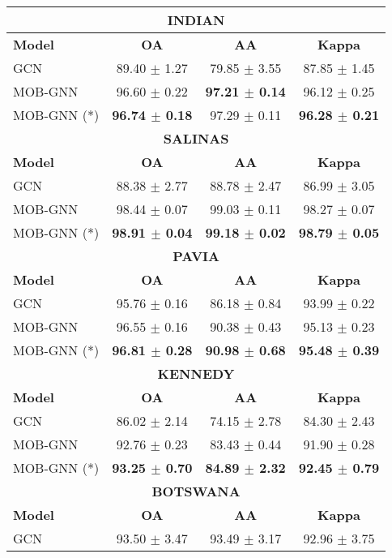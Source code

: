 \begin{table}[h]
\begin{minipage}{0.49\textwidth}
\centering
\small
\begin{tabular}{|lccc|}
\hline
\multicolumn{4}{|c|}{\textbf{INDIAN}} \\
\hline
\textbf{Model} & \textbf{OA} & \textbf{AA} & \textbf{Kappa} \\
\hline
GCN & 89.40 $\pm$ 1.27 & 79.85 $\pm$ 3.55 & 87.85 $\pm$ 1.45 \\
MOB-GNN & 96.60 $\pm$ 0.22 & \textbf{97.21 $\pm$ 0.14} & 96.12 $\pm$ 0.25 \\
MOB-GNN (*) & \textbf{96.74 $\pm$ 0.18} & 97.29 $\pm$ 0.11 & \textbf{96.28 $\pm$ 0.21} \\
\hline
\multicolumn{4}{|c|}{\textbf{SALINAS}} \\
\hline
\textbf{Model} & \textbf{OA} & \textbf{AA} & \textbf{Kappa} \\
\hline
GCN & 88.38 $\pm$ 2.77 & 88.78 $\pm$ 2.47 & 86.99 $\pm$ 3.05 \\
MOB-GNN & 98.44 $\pm$ 0.07 & 99.03 $\pm$ 0.11 & 98.27 $\pm$ 0.07 \\
MOB-GNN (*) & \textbf{98.91 $\pm$ 0.04} & \textbf{99.18 $\pm$ 0.02} & \textbf{98.79 $\pm$ 0.05} \\
\hline
\multicolumn{4}{|c|}{\textbf{PAVIA}} \\
\hline
\textbf{Model} & \textbf{OA} & \textbf{AA} & \textbf{Kappa} \\
\hline
GCN & 95.76 $\pm$ 0.16 & 86.18 $\pm$ 0.84 & 93.99 $\pm$ 0.22 \\
MOB-GNN & 96.55 $\pm$ 0.16 & 90.38 $\pm$ 0.43 & 95.13 $\pm$ 0.23 \\
MOB-GNN (*) & \textbf{96.81 $\pm$ 0.28} & \textbf{90.98 $\pm$ 0.68} & \textbf{95.48 $\pm$ 0.39} \\
\hline
\multicolumn{4}{|c|}{\textbf{KENNEDY}} \\
\hline
\textbf{Model} & \textbf{OA} & \textbf{AA} & \textbf{Kappa} \\
\hline
GCN & 86.02 $\pm$ 2.14 & 74.15 $\pm$ 2.78 & 84.30 $\pm$ 2.43 \\
MOB-GNN & 92.76 $\pm$ 0.23 & 83.43 $\pm$ 0.44 & 91.90 $\pm$ 0.28 \\
MOB-GNN (*) & \textbf{93.25 $\pm$ 0.70} & \textbf{84.89 $\pm$ 2.32} & \textbf{92.45 $\pm$ 0.79} \\
\hline
\multicolumn{4}{|c|}{\textbf{BOTSWANA}} \\
\hline
\textbf{Model} & \textbf{OA} & \textbf{AA} & \textbf{Kappa} \\
\hline
GCN & 93.50 $\pm$ 3.47 & 93.49 $\pm$ 3.17 & 92.96 $\pm$ 3.75 \\

\end{tabular}
\end{minipage}
\end{table}
